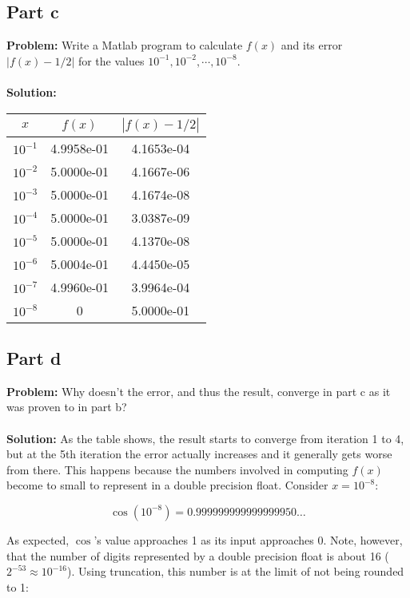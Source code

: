 \documentclass{article}
\begin{document}
\subsection*{Part c}
\textbf{Problem:} Write a Matlab program to calculate $f(x)$ and its error $|f(x)-1/2|$ for the values $10^{-1},10^{-2},\cdots,10^{-8}$.
\\\\
\textbf{Solution:}
\begin{center}
\begin{tabular}{c|c|c}
      $x$ & $f(x)$ & $|f(x)-1/2|$\\
      \hline
      $10^{-1}$ & 4.9958e-01 & 4.1653e-04\\
      $10^{-2}$ & 5.0000e-01 & 4.1667e-06\\
      $10^{-3}$ & 5.0000e-01 & 4.1674e-08\\
      $10^{-4}$ & 5.0000e-01 & 3.0387e-09\\ %
      $10^{-5}$ & 5.0000e-01 & 4.1370e-08\\ %
      $10^{-6}$ & 5.0004e-01 & 4.4450e-05\\ %
      $10^{-7}$ & 4.9960e-01 & 3.9964e-04\\ %
      $10^{-8}$ & 0 & 5.0000e-01 %
\end{tabular}
\end{center}

\subsection*{Part d}
\textbf{Problem:} Why doesn't the error, and thus the result, converge in part c as it was proven to in part b?
\\\\
\textbf{Solution:} As the table shows, the result starts to converge from iteration 1 to 4, but at the 5th iteration the error actually increases and it generally gets worse from there. This happens because the numbers involved in computing $f(x)$ become to small to represent in a double precision float. Consider $x=10^{-8}$:

$$\cos(10^{-8})=0.999999999999999950\dots$$

As expected, $\cos$'s value approaches 1 as its input approaches 0. Note, however, that the number of digits represented by a double precision float is about 16 ($2^{-53}\approx10^{-16}$). Using truncation, this number is at the limit of not being rounded to 1:
\end{document}

